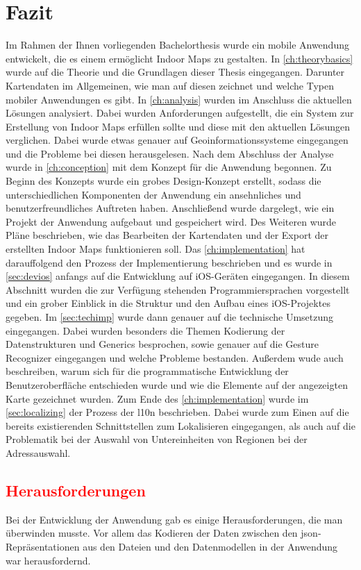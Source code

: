 \chapter{Fazit}
\label{ch:conclusion}
Im Rahmen der Ihnen vorliegenden Bachelorthesis wurde ein mobile Anwendung entwickelt, die es einem ermöglicht Indoor Maps zu gestalten.
In \autoref{ch:theorybasics} wurde auf die Theorie und die Grundlagen dieser Thesis eingegangen.
Darunter Kartendaten im Allgemeinen, wie man auf diesen zeichnet und welche Typen mobiler Anwendungen es gibt.\pbreak%
%
In \autoref{ch:analysis} wurden im Anschluss die aktuellen Lösungen analysiert.
Dabei wurden Anforderungen aufgestellt, die ein System zur Erstellung von Indoor Maps erfüllen sollte und diese mit den aktuellen Lösungen verglichen.
Dabei wurde etwas genauer auf Geoinformationssysteme eingegangen und die Probleme bei diesen herausgelesen.\pbreak%
%
Nach dem Abschluss der Analyse wurde in \autoref{ch:conception} mit dem Konzept für die Anwendung begonnen.
Zu Beginn des Konzepts wurde ein grobes Design-Konzept erstellt, sodass die unterschiedlichen Komponenten der Anwendung ein ansehnliches und benutzerfreundliches Auftreten haben.
Anschließend wurde dargelegt, wie ein Projekt der Anwendung aufgebaut und gespeichert wird.
Des Weiteren wurde Pläne beschrieben, wie das Bearbeiten der Kartendaten und der Export der erstellten Indoor Maps funktionieren soll.\pbreak%
%
Das \autoref{ch:implementation} hat darauffolgend den Prozess der Implementierung beschrieben und es wurde in \autoref{sec:devios} anfangs auf die Entwicklung auf iOS-Geräten eingegangen.
In diesem Abschnitt wurden die zur Verfügung stehenden Programmiersprachen vorgestellt und ein grober Einblick in die Struktur und den Aufbau eines iOS-Projektes gegeben.
Im \autoref{sec:techimp} wurde dann genauer auf die technische Umsetzung eingegangen.
Dabei wurden besonders die Themen Kodierung der Datenstrukturen und Generics besprochen, sowie genauer auf die Gesture Recognizer eingegangen und welche Probleme bestanden.
Außerdem wude auch beschreiben, warum sich für die programmatische Entwicklung der Benutzeroberfläche entschieden wurde und wie die Elemente auf der angezeigten Karte gezeichnet wurden.\pbreak%
%
Zum Ende des \autoref{ch:implementation} wurde im \autoref{sec:localizing} der Prozess der \Gls{l10n} beschrieben.
Dabei wurde zum Einen auf die bereits existierenden Schnittstellen zum Lokalisieren eingegangen, als auch auf die Problematik bei der Auswahl von Untereinheiten von Regionen bei der Adressauswahl.

\section{\textcolor{red}{Herausforderungen}}
Bei der Entwicklung der Anwendung gab es einige Herausforderungen, die man überwinden musste.
Vor allem das Kodieren der Daten zwischen den \ac{json}-Repräsentationen aus den Dateien und den Datenmodellen in der Anwendung war herausfordernd.

